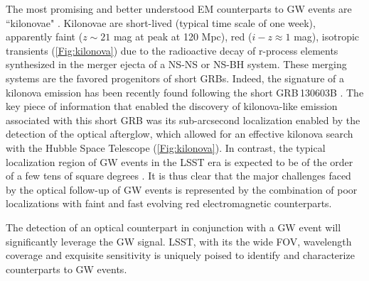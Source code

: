 The most promising and better understood EM counterparts to GW events
are ``kilonovae" \citep{Li98,Metzger10,Metzger12,Kasen13,Barnes13}.
Kilonovae are short-lived (typical time scale of one week), apparently
faint ($z\sim21$ mag at peak at 120 Mpc), red ($i-z\approx1$ mag),
isotropic transients (\autoref{Fig:kilonova}) due to the radioactive
decay of r-process elements synthesized in the merger ejecta of a NS-NS
or NS-BH system. These merging systems are the favored progenitors of
short GRBs. Indeed, the signature of a kilonova emission has been
recently found following the short GRB\,130603B
\citep{Berger13,Tanvir13}. The key piece of information that enabled the
discovery of kilonova-like emission associated with  this short GRB was
its sub-arcsecond localization enabled by the detection of the optical
afterglow, which allowed for an effective kilonova search with the
Hubble Space Telescope (\autoref{Fig:kilonova}). In contrast, the
typical localization region of GW events in the LSST era is expected to
be of the order of a few tens of square degrees \citep{aaa+13}. It is
thus clear that the major challenges faced by the optical follow-up of
GW events is represented by the combination of poor localizations with
faint and fast evolving red electromagnetic counterparts.

The detection of an optical counterpart in conjunction with a GW event
will significantly leverage the GW signal. LSST, with its the wide FOV,
wavelength coverage and exquisite sensitivity is uniquely poised to
identify and characterize counterparts to GW events.

